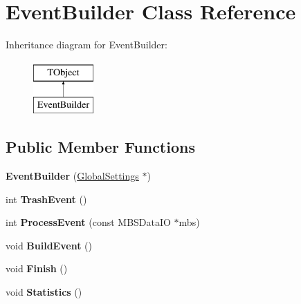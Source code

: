 \hypertarget{class_event_builder}{\section{Event\-Builder Class Reference}
\label{class_event_builder}
}
Inheritance diagram for Event\-Builder\-:\begin{figure}[H]
\begin{center}
\leavevmode
\includegraphics[height=2.000000cm]{class_event_builder}
\end{center}
\end{figure}
\subsection*{Public Member Functions}
\begin{DoxyCompactItemize}
\item 
\hypertarget{class_event_builder_ae5bc6281c66e115f92ab1aad525cc71b}{{\bfseries Event\-Builder} (\hyperlink{class_global_settings}{Global\-Settings} $\ast$)}\label{class_event_builder_ae5bc6281c66e115f92ab1aad525cc71b}

\item 
\hypertarget{class_event_builder_a19d233a535cc211f91f5de56f4c42e9c}{int {\bfseries Trash\-Event} ()}\label{class_event_builder_a19d233a535cc211f91f5de56f4c42e9c}

\item 
\hypertarget{class_event_builder_a4e469463e20974bc7be2cfa0ab3874f5}{int {\bfseries Process\-Event} (const M\-B\-S\-Data\-I\-O $\ast$mbs)}\label{class_event_builder_a4e469463e20974bc7be2cfa0ab3874f5}

\item 
\hypertarget{class_event_builder_a5e3732d9c2aa0539c0e01e22ce7f5c88}{void {\bfseries Build\-Event} ()}\label{class_event_builder_a5e3732d9c2aa0539c0e01e22ce7f5c88}

\item 
\hypertarget{class_event_builder_abcc24c43c7bcca0c9e445141349fd816}{void {\bfseries Finish} ()}\label{class_event_builder_abcc24c43c7bcca0c9e445141349fd816}

\item 
\hypertarget{class_event_builder_a840f7a4c8d9bb81e92007cfb19637bff}{void {\bfseries Statistics} ()}\label{class_event_builder_a840f7a4c8d9bb81e92007cfb19637bff}

\end{DoxyCompactItemize}
